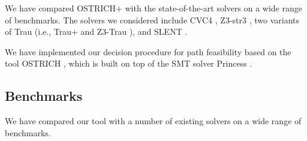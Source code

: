 
We have compared OSTRICH+ with the state-of-the-art solvers on a wide range of benchmarks. The solvers we considered include CVC4 \cite{cvc4}, Z3-str3 \cite{Z3-str}, two variants of Trau (i.e., Trau+ \cite{AbdullaA+19} and Z3-Trau \cite{Abdulla17}), and SLENT \cite{WC+18}. 

 

We have implemented our decision procedure for path feasibility based on the tool OSTRICH \cite{CHL+19}, which is built on top of the SMT solver Princess \cite{}. 
%


\subsection{Benchmarks}
 
We have compared our tool with a number of existing solvers on a wide range of benchmarks. 


